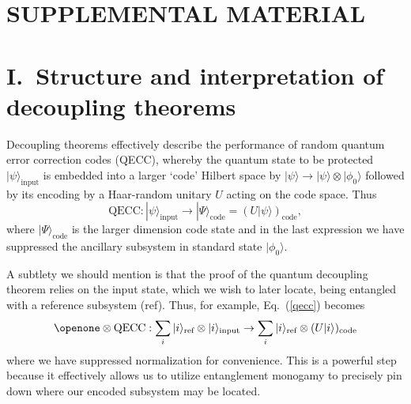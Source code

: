 \documentclass[aps,showpacs,prl,12pt]{revtex4}
\begin{document}
\section*{SUPPLEMENTAL MATERIAL}


\section{I.\ Structure and interpretation of decoupling theorems}

Decoupling theorems effectively describe the performance of random
quantum error correction codes (QECC), whereby the quantum state
to be protected $|\psi\rangle_{\text{input}}$ is embedded into a
larger `code' Hilbert space by
$|\psi\rangle\rightarrow |\psi\rangle\otimes |\phi_0\rangle$ followed by
its encoding by a Haar-random unitary $U$ acting on the code space. Thus
\begin{equation}
\text{QECC}:|\psi\rangle_{\text{input}}\rightarrow
|\Psi\rangle_{\text{code}}=(U|\psi\rangle)_{\text{code}},
\label{qecc}
\end{equation}
where $|\Psi\rangle_{\text{code}}$ is the larger dimension code state
and in the last expression we have suppressed the ancillary subsystem
in standard state $|\phi_0\rangle$.

A subtlety we should mention is that the proof of the quantum
decoupling theorem relies on the input state, which we wish to later
locate, being entangled with a reference subsystem (ref). Thus, for
example, Eq.~(\ref{qecc}) becomes
\begin{equation}
\openone\otimes \text{QECC}:\sum_i|i\rangle_{\text{ref}}
\otimes |i\rangle_{\text{input}}
\rightarrow
\sum_i|i\rangle_{\text{ref}}\otimes(U|i\rangle)_{\text{code}}
\label{eqecc}
\end{equation}
where we have suppressed normalization for convenience.
This is a powerful step because it effectively allows us to utilize
entanglement monogamy to precisely pin down where our encoded
subsystem may be located.
\end{document}
